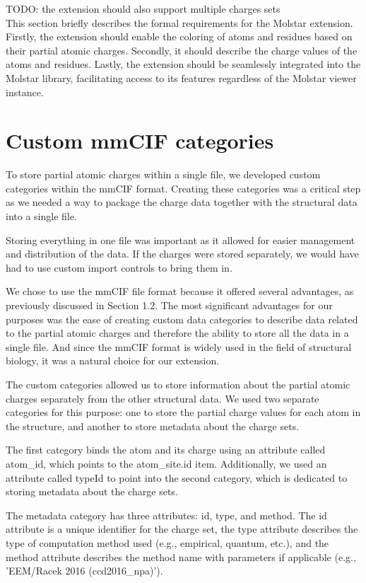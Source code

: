 \documentclass[
  digital,     %
  oneside,     %
  nosansbold,  %
  nocolorbold, %
  lof,         %
  lot,         %
]{fithesis4}
\begin{document}
TODO: the extension should also support multiple charges sets \\

This section briefly describes the formal requirements for the Molstar extension. Firstly, the extension should enable the coloring of atoms and residues based on their partial atomic charges. Secondly, it should describe the charge values of the atoms and residues. Lastly, the extension should be seamlessly integrated into the Molstar library, facilitating access to its features regardless of the Molstar viewer instance.

\section{Custom mmCIF categories}
\label{section:custom_mmcif_categories}

To store partial atomic charges within a single file, we developed custom categories within the mmCIF format. Creating these categories was a critical step as we needed a way to package the charge data together with the structural data into a single file.

Storing everything in one file was important as it allowed for easier management and distribution of the data. If the charges were stored separately, we would have had to use custom import controls to bring them in.

We chose to use the mmCIF file format because it offered several advantages, as previously discussed in Section 1.2. The most significant advantages for our purposes was the ease of creating custom data categories to describe data related to the partial atomic charges and therefore the ability to store all the data in a single file. And since the mmCIF format is widely used in the field of structural biology, it was a natural choice for our extension.

The custom categories allowed us to store information about the partial atomic charges separately from the other structural data. We used two separate categories for this purpose: one to store the partial charge values for each atom in the structure, and another to store metadata about the charge sets.

The first category binds the atom and its charge using an attribute called atom\_id, which points to the atom\_site.id item. Additionally, we used an attribute called typeId to point into the second category, which is dedicated to storing metadata about the charge sets.

The metadata category has three attributes: id, type, and method. The id attribute is a unique identifier for the charge set, the type attribute describes the type of computation method used (e.g., empirical, quantum, etc.), and the method attribute describes the method name with parameters if applicable (e.g., 'EEM/Racek 2016 (ccd2016\_npa)').
\end{document}

